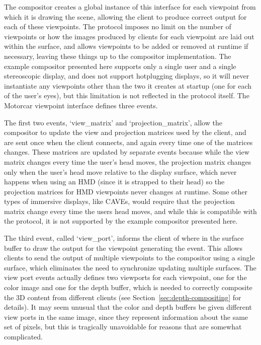 The compositor creates a global instance of this interface for each viewpoint from which it is drawing the scene, allowing the client to produce correct output for each of these viewpoints. The protocol imposes no limit on the number of viewpoints or how the images produced by clients for each viewpoint are laid out within the surface, and allows viewpoints to be added or removed at runtime if necessary, leaving these things up to the compositor implementation. The example compositor presented here supports only a single user and a single stereoscopic display, and does not support hotplugging displays, so it will never instantiate any viewpoints other than the two it creates at startup (one for each of the user's eyes), but this limitation is not reflected in the protocol itself. The Motorcar viewpoint interface defines three events. 

The first two events, `view{\_}matrix' and `projection{\_}matrix', allow the compositor to update the view and projection matrices used by the client, and are sent once when the client connects, and again every time one of the matrices changes. These matrices are updated by separate events because while the view matrix changes every time the user's head moves, the projection matrix changes only when the user's head move relative to the display surface, which never happens when using an HMD (since it is strapped to their head) so the projection matrices for HMD viewpoints never changes at runtime. Some other types of immersive displays, like CAVEs, would require that the projection matrix change every time the users head moves, and while this is compatible with the protocol, it is not supported by the example compositor presented here.

The third event, called `view{\_}port', informs the client of where in the surface buffer to draw the output for the viewpoint generating the event. This allows clients to send the output of multiple viewpoints to the compositor using a single surface, which eliminates the need to synchronize updating multiple surfaces. The view port events actually defines two viewports for each viewpoint, one for the color image and one for the depth buffer, which is needed to correctly composite the 3D content from different clients (see Section~\ref{sec:depth-compositing} for details). It may seem unusual that the color and depth buffers be given different view ports in the same image, since they represent information about the same set of pixels, but this is tragically unavoidable for reasons that are somewhat complicated.

